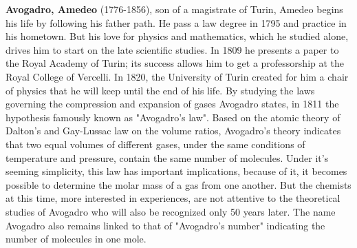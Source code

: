 \pichskip{15pt}%
\textbf{Avogadro, Amedeo} (1776-1856), son of a magistrate of Turin, Amedeo begins his life by following his father path. He pass a law degree in 1795 and practice in his hometown. But his love for physics and mathematics, which he studied alone, drives him to start on the late scientific studies. In 1809 he presents a paper to the Royal Academy of Turin; its success allows him to get a professorship at the Royal College of Vercelli. In 1820, the University of Turin created for him a chair of physics that he will keep until the end of his life. By studying the laws governing the compression and expansion of gases Avogadro states, in 1811 the hypothesis famously known as "Avogadro's law". Based on the atomic theory of Dalton's and Gay-Lussac law on the volume ratios, Avogadro's theory indicates that two equal volumes of different gases, under the same conditions of temperature and pressure, contain the same number of molecules. Under it's seeming simplicity, this law has important implications, because of it, it becomes possible to determine the molar mass of a gas from one another. But the chemists at this time, more interested in experiences, are not attentive to the theoretical studies of Avogadro who will also be recognized only 50 years later. The name Avogadro also remains linked to that of "Avogadro's number" indicating the number of molecules in one mole.

{}	
\label{sec:B}

